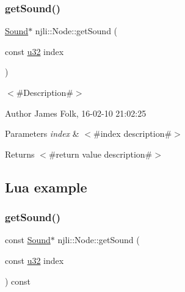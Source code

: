 \begin{DoxyCodeInclude}
\end{DoxyCodeInclude}
\mbox{\label{classnjli_1_1_node_ab286bddc61b0c95e5fc66f57862134af}} 
\subsubsection{\texorpdfstring{get\+Sound()}{getSound()}\hspace{0.1cm}{\footnotesize\ttfamily [1/2]}}
{\footnotesize\ttfamily \mbox{\hyperlink{classnjli_1_1_sound}{Sound}}$\ast$ njli\+::\+Node\+::get\+Sound (\begin{DoxyParamCaption}\item[{const \mbox{\hyperlink{_util_8h_a10e94b422ef0c20dcdec20d31a1f5049}{u32}}}]{index }\end{DoxyParamCaption})}



$<$\#\+Description\#$>$ 

\begin{DoxyAuthor}{Author}
James Folk, 16-\/02-\/10 21\+:02\+:25
\end{DoxyAuthor}

\begin{DoxyParams}{Parameters}
{\em index} & $<$\#index description\#$>$\\
\hline
\end{DoxyParams}
\begin{DoxyReturn}{Returns}
$<$\#return value description\#$>$
\end{DoxyReturn}
\hypertarget{classnjli_1_1_steering_behavior_wander_ex1}{}\subsection{Lua example}\label{classnjli_1_1_steering_behavior_wander_ex1}

\begin{DoxyCodeInclude}
\end{DoxyCodeInclude}
\mbox{\label{classnjli_1_1_node_a4d6aa88b18a3bc0a4c7f912a36933ca4}} 
\subsubsection{\texorpdfstring{get\+Sound()}{getSound()}\hspace{0.1cm}{\footnotesize\ttfamily [2/2]}}
{\footnotesize\ttfamily const \mbox{\hyperlink{classnjli_1_1_sound}{Sound}}$\ast$ njli\+::\+Node\+::get\+Sound (\begin{DoxyParamCaption}\item[{const \mbox{\hyperlink{_util_8h_a10e94b422ef0c20dcdec20d31a1f5049}{u32}}}]{index }\end{DoxyParamCaption}) const}



